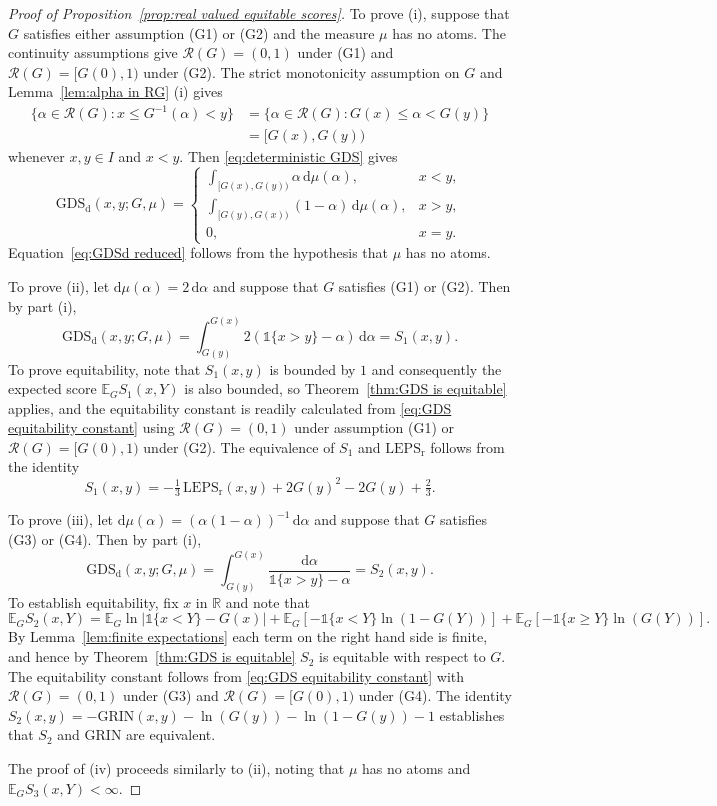 \documentclass[10pt]{article} %
\theoremstyle{theorem}
\theoremstyle{definition}
\newcommand{\RRR}{\mathbb{R}}
\newcommand{\EEE}{\mathbb{E}}
\newcommand{\dd}{\mathrm{d}}
\newcommand{\one}{\mathds{1}}
\newcommand{\GDSd}{\mathrm{GDS}_\mathrm{d}}
\newcommand{\LEPSr}{\mathrm{LEPS}_\mathrm{r}}
\newcommand{\Grin}{\mathrm{GRIN}}
\newcommand{\RG}{\mathcal{R}(G)}
\begin{document}
\begin{proof}[Proof of Proposition~\ref{prop:real valued equitable scores}]
To prove (i), suppose that $G$ satisfies either assumption (G1) or (G2) and the measure $\mu$ has no atoms. The continuity assumptions give $\RG=(0,1)$ under (G1) and $\RG=[G(0),1)$ under (G2). The strict monotonicity assumption on $G$ and Lemma~\ref{lem:alpha in RG} (i) gives
\begin{align*}
\{\alpha\in\RG:x\leq G^{-1}(\alpha)<y\}
&=\{\alpha\in\RG:G(x)\leq \alpha< G(y)\} \\
&=[G(x),G(y))
\end{align*}
whenever $x,y \in I$ and $x<y$. Then \eqref{eq:deterministic GDS} gives
\[
\GDSd(x,y;G,\mu)
=
\begin{cases}
\displaystyle\int_{[G(x),G(y))}  \alpha \,\dd\mu(\alpha), & x<y, \\
\displaystyle\int_{[G(y),G(x))} (1-\alpha) \,\dd\mu(\alpha), & x>y, \\
0, & x=y.
\end{cases}
\]
Equation~\eqref{eq:GDSd reduced} follows from the hypothesis that $\mu$ has no atoms.

To prove (ii), let $\dd\mu(\alpha)=2\,\dd\alpha$ and suppose that $G$ satisfies (G1) or (G2). Then by part (i),
\[
\GDSd(x,y;G,\mu)= \int_{G(y)}^{G(x)}2(\one\{x>y\} - \alpha)\,\dd\alpha = S_1(x,y).
\]
To prove equitability, note that $S_1(x,y)$ is bounded by $1$ and consequently the expected score $\EEE_G S_1(x,Y)$ is also bounded, so Theorem~\ref{thm:GDS is equitable} applies, and the equitability constant is readily calculated from \eqref{eq:GDS equitability constant} using $\RG=(0,1)$ under assumption (G1) or  $\RG=[G(0),1)$ under (G2). The equivalence of $S_1$ and $\LEPSr$ follows from the identity
\begin{equation}\label{eq:S1 LEPS equivalence}
S_1(x,y)=-\tfrac{1}{3}\,\LEPSr(x,y) + 2G(y)^2-2G(y)+\tfrac{2}{3}.
\end{equation}

To prove (iii), let $\dd\mu(\alpha)=(\alpha(1-\alpha))^{-1}\,\dd\alpha$ and suppose that $G$ satisfies (G3) or (G4). Then by part (i),
\[
\GDSd(x,y;G,\mu) = \int_{G(y)}^{G(x)} \frac{\dd\alpha}{\one\{x>y\} - \alpha} = S_2(x,y).
\]
To establish equitability, fix $x$ in $\RRR$ and note that
\begin{equation}\label{eq:S2 decomp}
\EEE_G S_2(x,Y)=\EEE_G \ln|\one\{x< Y\} - G(x)| + \EEE_G[-\one\{x< Y\}\ln(1-G(Y))] + \EEE_G[-\one\{x \geq Y\}\ln(G(Y))].
\end{equation}
By Lemma~\ref{lem:finite expectations} each term on the right hand side is finite, and hence by Theorem~\ref{thm:GDS is equitable} $S_2$ is equitable with respect to $G$. The equitability constant follows from \eqref{eq:GDS equitability constant} with $\RG=(0,1)$ under (G3) and $\RG=[G(0),1)$ under (G4). The identity $S_2(x,y)= -\Grin(x,y) - \ln(G(y)) - \ln(1-G(y)) - 1$ establishes that $S_2$ and $\Grin$ are equivalent.

The proof of (iv) proceeds similarly to (ii), noting that $\mu$ has no atoms and $\EEE_G S_3(x,Y)<\infty$.
\end{proof}
\end{document}
